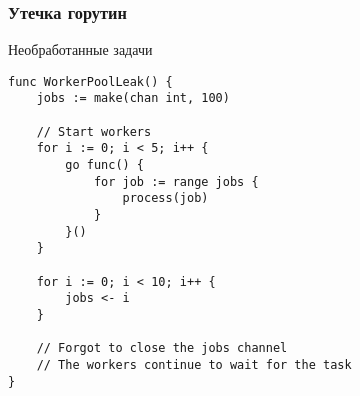 \documentclass[10pt]{beamer}
\begin{document}
        \begin{frame}[fragile]
        \frametitle{Утечка горутин}
        \begin{block}{Необработанные задачи}
        \begin{lstlisting}[style=gostyle, language=Golang]
func WorkerPoolLeak() {
    jobs := make(chan int, 100)

    // Start workers
    for i := 0; i < 5; i++ {
        go func() {
            for job := range jobs {
                process(job)
            }
        }()
    }

    for i := 0; i < 10; i++ {
        jobs <- i
    }

    // Forgot to close the jobs channel
    // The workers continue to wait for the task
}
        \end{lstlisting}
        \end{block}
        \end{frame}
\end{document}
